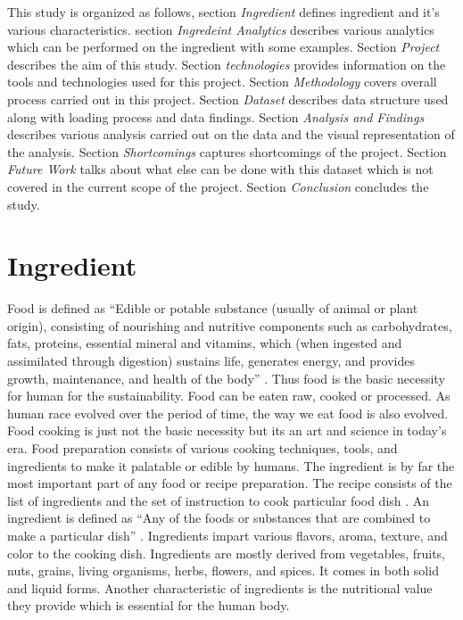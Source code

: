 \documentclass[sigconf]{acmart}
\begin{document}
This study is organized as follows, section \emph{Ingredient} defines ingredient and it's various characteristics. section \emph{Ingredeint Analytics} describes various analytics which can be performed on the ingredient with some examples. Section \emph{Project} describes the aim of this study. Section \emph{technologies} provides information on the tools and technologies used for this project. Section \emph{Methodology} covers overall process carried out in this project. Section \emph{Dataset} describes data structure used along with loading process and data findings. Section \emph{Analysis and Findings} describes various analysis carried out on the data and the visual representation of the analysis. Section \emph{Shortcomings} captures shortcomings of the project. Section \emph{Future Work} talks about what else can be done with this dataset which is not covered in the current scope of the project. Section \emph{Conclusion} concludes the study.  

\section{Ingredient}
Food is defined as ``Edible or potable substance (usually of animal or plant origin), consisting of nourishing and nutritive components such as carbohydrates, fats, proteins, essential mineral and vitamins, which (when ingested and assimilated through digestion) sustains life, generates energy, and provides growth, maintenance, and health of the body'' \cite{www-businessdictionary}. Thus food is the basic necessity for human for the sustainability. Food can be eaten raw, cooked or processed. As human race evolved over the period of time, the way we eat food is also evolved. Food cooking is just not the basic necessity but its an art and science in today's era. Food preparation consists of various cooking techniques, tools, and ingredients to make it palatable or edible by humans. The ingredient is by far the most important part of any food or recipe preparation. The recipe consists of the list of ingredients and the set of instruction to cook particular food dish \cite{www-collinsdictionary}. An ingredient is defined as ``Any of the foods or substances that are combined to make a particular dish'' \cite{www-oxforddictionaries}. Ingredients impart various flavors, aroma, texture, and color to the cooking dish. Ingredients are mostly derived from vegetables, fruits, nuts, grains, living organisms, herbs, flowers, and spices. It comes in both solid and liquid forms. Another characteristic of ingredients is the nutritional value they provide which is essential for the human body.
\end{document}
